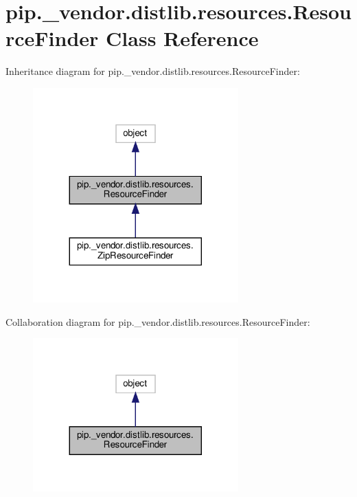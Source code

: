 \hypertarget{classpip_1_1__vendor_1_1distlib_1_1resources_1_1ResourceFinder}{}\section{pip.\+\_\+vendor.\+distlib.\+resources.\+Resource\+Finder Class Reference}
\label{classpip_1_1__vendor_1_1distlib_1_1resources_1_1ResourceFinder}


Inheritance diagram for pip.\+\_\+vendor.\+distlib.\+resources.\+Resource\+Finder\+:
\nopagebreak
\begin{figure}[H]
\begin{center}
\leavevmode
\includegraphics[width=224pt]{classpip_1_1__vendor_1_1distlib_1_1resources_1_1ResourceFinder__inherit__graph}
\end{center}
\end{figure}


Collaboration diagram for pip.\+\_\+vendor.\+distlib.\+resources.\+Resource\+Finder\+:
\nopagebreak
\begin{figure}[H]
\begin{center}
\leavevmode
\includegraphics[width=224pt]{classpip_1_1__vendor_1_1distlib_1_1resources_1_1ResourceFinder__coll__graph}
\end{center}
\end{figure}
